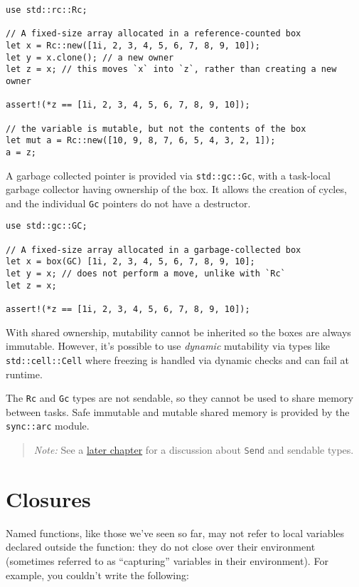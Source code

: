\documentclass[]{article}
\begin{document}
\begin{verbatim}
use std::rc::Rc;

// A fixed-size array allocated in a reference-counted box
let x = Rc::new([1i, 2, 3, 4, 5, 6, 7, 8, 9, 10]);
let y = x.clone(); // a new owner
let z = x; // this moves `x` into `z`, rather than creating a new owner

assert!(*z == [1i, 2, 3, 4, 5, 6, 7, 8, 9, 10]);

// the variable is mutable, but not the contents of the box
let mut a = Rc::new([10, 9, 8, 7, 6, 5, 4, 3, 2, 1]);
a = z;
\end{verbatim}

A garbage collected pointer is provided via \texttt{std::gc::Gc}, with a
task-local garbage collector having ownership of the box. It allows the
creation of cycles, and the individual \texttt{Gc} pointers do not have
a destructor.

\begin{verbatim}
use std::gc::GC;

// A fixed-size array allocated in a garbage-collected box
let x = box(GC) [1i, 2, 3, 4, 5, 6, 7, 8, 9, 10];
let y = x; // does not perform a move, unlike with `Rc`
let z = x;

assert!(*z == [1i, 2, 3, 4, 5, 6, 7, 8, 9, 10]);
\end{verbatim}

With shared ownership, mutability cannot be inherited so the boxes are
always immutable. However, it's possible to use \emph{dynamic}
mutability via types like \texttt{std::cell::Cell} where freezing is
handled via dynamic checks and can fail at runtime.

The \texttt{Rc} and \texttt{Gc} types are not sendable, so they cannot
be used to share memory between tasks. Safe immutable and mutable shared
memory is provided by the \texttt{sync::arc} module.

\begin{quote}
\emph{Note:} See a \hyperref[traits]{later chapter} for a discussion
about \texttt{Send} and sendable types.
\end{quote}

\section{Closures}\label{closures}

Named functions, like those we've seen so far, may not refer to local
variables declared outside the function: they do not close over their
environment (sometimes referred to as ``capturing'' variables in their
environment). For example, you couldn't write the following:
\end{document}
